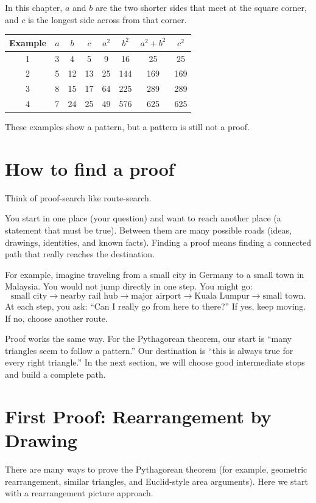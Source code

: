 \noindent
In this chapter, \(a\) and \(b\) are the two shorter sides that meet at the
square corner, and \(c\) is the longest side across from that corner.

\begin{center}
\begin{tabular}{|c|c|c|c|c|c|c|c|}
\hline
Example & \(a\) & \(b\) & \(c\) & \(a^2\) & \(b^2\) & \(a^2+b^2\) & \(c^2\) \\
\hline
1 & 3 & 4 & 5 & 9 & 16 & 25 & 25 \\
\hline
2 & 5 & 12 & 13 & 25 & 144 & 169 & 169 \\
\hline
3 & 8 & 15 & 17 & 64 & 225 & 289 & 289 \\
\hline
4 & 7 & 24 & 25 & 49 & 576 & 625 & 625 \\
\hline
\end{tabular}
\end{center}

\noindent
These examples show a pattern, but a pattern is still not a proof.

\section{How to find a proof}
Think of proof-search like route-search.

You start in one place (your question) and want to reach another place (a
statement that must be true). Between them are many possible roads (ideas,
drawings, identities, and known facts). Finding a proof means finding a
connected path that really reaches the destination.

For example, imagine traveling from a small city in Germany to a small town in
Malaysia. You would not jump directly in one step. You might go:
\[
\text{small city} \rightarrow \text{nearby rail hub} \rightarrow \text{major airport}
\rightarrow \text{Kuala Lumpur} \rightarrow \text{small town}.
\]
At each step, you ask: ``Can I really go from here to there?'' If yes, keep
moving. If no, choose another route.

Proof works the same way. For the Pythagorean theorem, our start is
``many triangles seem to follow a pattern.'' Our destination is
``this is always true for every right triangle.'' In the next section, we will
choose good intermediate stops and build a complete path.

\section{First Proof: Rearrangement by Drawing}
There are many ways to prove the Pythagorean theorem (for example, geometric
rearrangement, similar triangles, and Euclid-style area arguments). Here we
start with a rearrangement picture approach.


